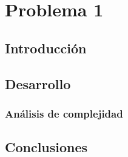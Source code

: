 \section{Problema 1}

\subsection{Introducci\'on}

\subsection{Desarrollo}

\subsubsection{An\'alisis de complejidad}

\subsection{Conclusiones}